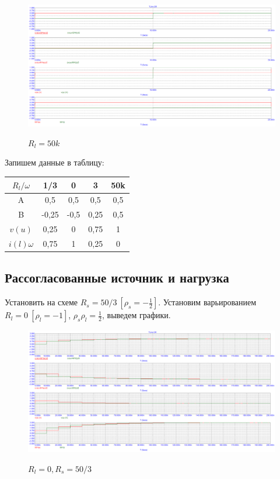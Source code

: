 \documentclass[a4paper, 12pt]{article}%
\begin{document}
\begin{figure}[h!]
\centering
\includegraphics[scale=0.4]{images/Graph7.png}
\label{fig:Image1}
\caption{$R_l = 50k$}
\end{figure}

Запишем данные в таблицу:

\begin{center}
\begin{tabular}{|c|c|c|c|c|}
\hline
$R_l/\omega$ & 1/3 & 0 & 3 & 50k \\
\hline
A & 0,5 & 0,5 & 0,5 & 0,5 \\
\hline
B & -0,25 & -0,5 & 0,25 & 0,5 \\
\hline
$v(u)$ & 0,25 & 0 & 0,75 & 1 \\
\hline
$i(l)\omega$ & 0,75 & 1 & 0,25 & 0 \\
\hline
\end{tabular}
\end{center}

\subsection*{Рассогласованные источник и нагрузка}

Установить на схеме $R_s = 50/3 \: [\rho_s = -\frac{1}{2}]$. Установим варьированием $R_l = 0 \: [\rho_l = -1]$, $\rho_s \rho_l = \frac{1}{2}$, выведем графики.

\begin{figure}[h!]
\centering
\includegraphics[scale=0.4]{images/Graph8.png}
\label{fig:Image1}
\caption{$R_l = 0, R_s = 50/3$}
\end{figure}
\end{document}
